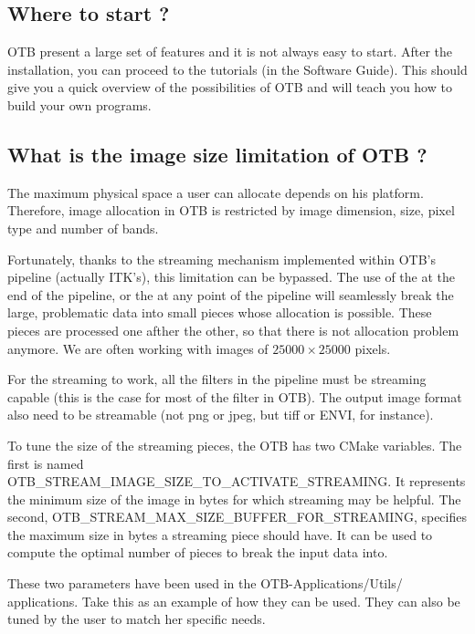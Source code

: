 \subsection{Where to start ?}

OTB present a large set of features and it is not always easy to start. After the 
installation, you can proceed to the tutorials (in the Software Guide). This should
give you a quick overview of the possibilities of OTB and will teach you how to 
build your own programs.

\subsection{What is the image size limitation of OTB ?}

The maximum physical space a user can allocate depends on his platform. Therefore, 
image allocation in OTB is restricted by image dimension, size, pixel type and number 
of bands.

Fortunately, thanks to the streaming mechanism implemented within
OTB's pipeline (actually ITK's), this limitation can be bypassed. The
use of the  at the end of the pipeline,
or the  at any point of the pipeline will
seamlessly break the large, problematic data into small pieces whose
allocation is possible. These pieces are processed one afther the
other, so that there is not allocation problem anymore. We are often working with
images of $25000 \times 25000$ pixels.

For the streaming to work, all the filters in the pipeline must be streaming capable 
(this is the case for most of the filter in OTB). The output image format also need to be 
streamable (not png or jpeg, but tiff or ENVI, for instance).

To tune the size of the streaming pieces, the OTB has
two CMake variables. The first is named
OTB\_STREAM\_IMAGE\_SIZE\_TO\_ACTIVATE\_STREAMING. It represents the
minimum size of the image in bytes for which streaming may be helpful. The
second, OTB\_STREAM\_MAX\_SIZE\_BUFFER\_FOR\_STREAMING, specifies the
maximum size in bytes a streaming piece should have. It can be used to
compute the optimal number of pieces to break the input data into.

These two parameters have been used in the OTB-Applications/Utils/
applications. Take this as an example of how they can be used. They
can also be tuned by the user to match her specific needs.


